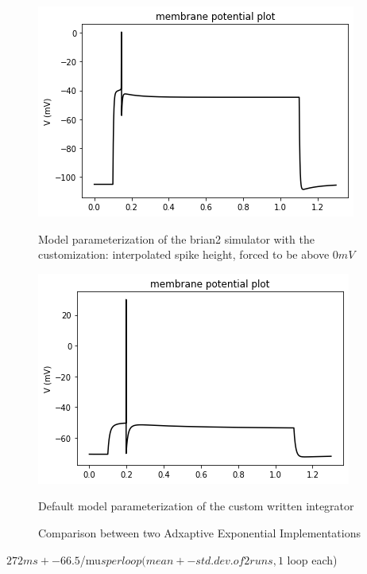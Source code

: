 \begin{figure}
\begin{center}
\centering
  \centering
\includegraphics[scale=0.45]{figures/backend_check_files/backend_check_12_10}
\caption{Model parameterization of the brian2 simulator with the customization: interpolated spike height, forced to be above $0mV$}

  \label{fig:sub1}
  \centering
  \includegraphics[scale=0.45]{figures/backend_check_files/backend_check_4_2}
    \caption{Default model parameterization of the custom written integrator}
  \label{fig:sub2}
\caption{Comparison between two Adxaptive Exponential Implementations}
\label{fig:test}
\end{center}
\end{figure}




    
$272 ms +- 66.5 $/mu$s per loop (mean +- std. dev. of 2 runs, 1$ loop each)

